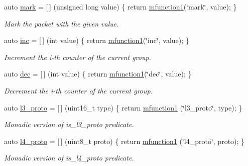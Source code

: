 \begin{DoxyCompactItemize}
auto \hyperlink{namespacepfq_1_1lang_1_1anonymous__namespace_02default_8hpp_03_a7b831baeabda070b89ca862a9445a4a8}{mark} = \mbox{[}$\,$\mbox{]} (unsigned long value) \{ return \hyperlink{namespacepfq_1_1lang_a68d775c68562fbd0ab9ef213f2519499}{mfunction1}(\char`\"{}mark\char`\"{}, value); \}
\begin{DoxyCompactList}\small\item\em Mark the packet with the given value. \end{DoxyCompactList}\item 
auto \hyperlink{namespacepfq_1_1lang_1_1anonymous__namespace_02default_8hpp_03_acc7d3a4cca5eb30ff5456e19c613b174}{inc} = \mbox{[}$\,$\mbox{]} (int value) \{ return \hyperlink{namespacepfq_1_1lang_a68d775c68562fbd0ab9ef213f2519499}{mfunction1}(\char`\"{}inc\char`\"{}, value); \}
\begin{DoxyCompactList}\small\item\em Increment the i-\/th counter of the current group. \end{DoxyCompactList}\item 
auto \hyperlink{namespacepfq_1_1lang_1_1anonymous__namespace_02default_8hpp_03_a139906841e77a2eb86b761b27ceeb685}{dec} = \mbox{[}$\,$\mbox{]} (int value) \{ return \hyperlink{namespacepfq_1_1lang_a68d775c68562fbd0ab9ef213f2519499}{mfunction1}(\char`\"{}dec\char`\"{}, value); \}
\begin{DoxyCompactList}\small\item\em Decrement the i-\/th counter of the current group. \end{DoxyCompactList}\item 
auto \hyperlink{namespacepfq_1_1lang_1_1anonymous__namespace_02default_8hpp_03_a1515f230673119530cd04f213627976f}{l3\+\_\+proto} = \mbox{[}$\,$\mbox{]} (uint16\+\_\+t type) \{ return \hyperlink{namespacepfq_1_1lang_a68d775c68562fbd0ab9ef213f2519499}{mfunction1} (\char`\"{}l3\+\_\+proto\char`\"{}, type); \}
\begin{DoxyCompactList}\small\item\em Monadic version of {\ttfamily is\+\_\+l3\+\_\+proto} predicate. \end{DoxyCompactList}\item 
auto \hyperlink{namespacepfq_1_1lang_1_1anonymous__namespace_02default_8hpp_03_a8ad2208c91dc3cd4378e715aab5fb4b7}{l4\+\_\+proto} = \mbox{[}$\,$\mbox{]} (uint8\+\_\+t proto) \{ return \hyperlink{namespacepfq_1_1lang_a68d775c68562fbd0ab9ef213f2519499}{mfunction1} (\char`\"{}l4\+\_\+proto\char`\"{}, proto); \}
\begin{DoxyCompactList}\small\item\em Monadic version of {\ttfamily is\+\_\+l4\+\_\+proto} predicate. \end{DoxyCompactList}\item 

\end{DoxyCompactItemize}
